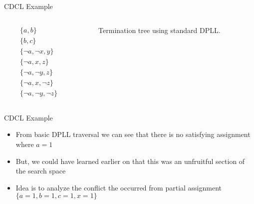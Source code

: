 \documentclass{beamer}
\begin{document}

\begin{frame}{CDCL Example}

    \begin{columns}
        \begin{column}{0.25\textwidth}
            \begin{align*}
                &\{a,b\}\\
                &\{b,c\}\\
                &\{\neg a, \neg x, y\} \\
                &\{\neg a, x, z\} \\
                &\{ \neg a, \neg y, z\} \\
                &\{ \neg a, x, \neg z\} \\
                &\{ \neg a, \neg y, \neg z\}
            \end{align*}
        \end{column}

        \begin{column}{0.65\textwidth}
            \begin{figure}
                
                \caption{Termination tree using standard DPLL.}
            \end{figure}
        \end{column}
    \end{columns}
\end{frame}

\begin{frame}{CDCL Example}
\begin{itemize}
    \item From basic DPLL traversal we can see that there is no satisfying assignment where $a=1$
    \item But, we could have learned earlier on that this was an unfruitful section of the search space
    \item Idea is to analyze the conflict the occurred from partial assignment $\{a=1,b=1,c=1,x=1\}$
\end{itemize}
\end{frame}
\end{document}
